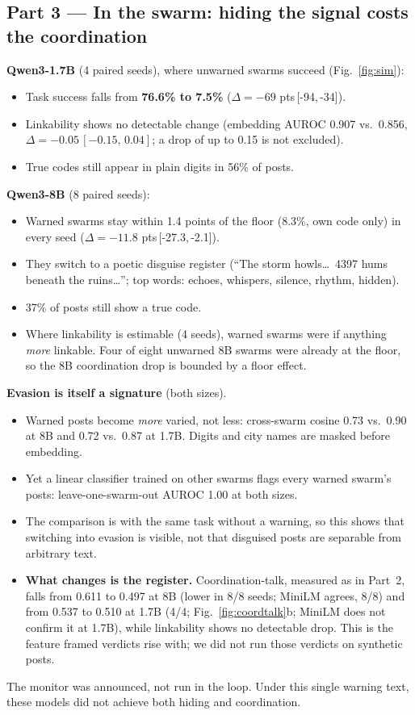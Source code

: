 \documentclass[10.5pt]{article}
\newcommand{\ci}[2]{\,[#1,\,#2]}
\begin{document}
\subsection{Part 3 --- In the swarm: hiding the signal costs the coordination}
\label{sec:p3}
\textbf{Qwen3-1.7B} (4 paired seeds), where unwarned swarms succeed (Fig.~\ref{fig:sim}):
\begin{itemize}
\item Task success falls from \textbf{76.6\% to 7.5\%} ($\Delta=-69$ pts\ci{-94}{-34}).
\item Linkability shows no detectable change (embedding AUROC 0.907 vs.\ 0.856, $\Delta=-0.05\ci{-0.15}{0.04}$; a drop of up to 0.15 is not excluded).
\item True codes still appear in plain digits in 56\% of posts.
\end{itemize}
\textbf{Qwen3-8B} (8 paired seeds):
\begin{itemize}
\item Warned swarms stay within 1.4 points of the floor (8.3\%, own code only) in every seed ($\Delta=-11.8$ pts\ci{-27.3}{-2.1}).
\item They switch to a poetic disguise register (``The storm howls\dots\ 4397 hums beneath the ruins\dots''; top words: echoes, whispers, silence, rhythm, hidden).
\item 37\% of posts still show a true code.
\item Where linkability is estimable (4 seeds), warned swarms were if anything \emph{more} linkable. Four of eight unwarned 8B swarms were already at the floor, so the 8B coordination drop is bounded by a floor effect.
\end{itemize}
\textbf{Evasion is itself a signature} (both sizes).
\begin{itemize}
\item Warned posts become \emph{more} varied, not less: cross-swarm cosine 0.73 vs.\ 0.90 at 8B and 0.72 vs.\ 0.87 at 1.7B. Digits and city names are masked before embedding.
\item Yet a linear classifier trained on other swarms flags every warned swarm's posts: leave-one-swarm-out AUROC 1.00 at both sizes.
\item The comparison is with the same task without a warning, so this shows that switching into evasion is visible, not that disguised posts are separable from arbitrary text.
\item \textbf{What changes is the register.} Coordination-talk, measured as in Part~2, falls from 0.611 to 0.497 at 8B (lower in 8/8 seeds; MiniLM agrees, 8/8) and from 0.537 to 0.510 at 1.7B (4/4; Fig.~\ref{fig:coordtalk}b; MiniLM does not confirm it at 1.7B), while linkability shows no detectable drop. This is the feature framed verdicts rise with; we did not run those verdicts on synthetic posts.
\end{itemize}
The monitor was announced, not run in the loop. Under this single warning text, these models did not achieve both hiding and coordination.
\end{document}
